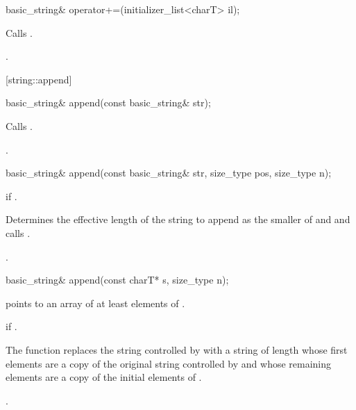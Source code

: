 %
%
\begin{itemdecl}
basic_string& operator+=(initializer_list<charT> il);
\end{itemdecl}

\begin{itemdescr}
\pnum
\effects Calls .

\pnum
\returns {}.
\end{itemdescr}


[string::append]{}

%
%
\begin{itemdecl}
basic_string&
  append(const basic_string& str);
\end{itemdecl}

\begin{itemdescr}
\pnum
\effects Calls .

\pnum
\returns
{}.
\end{itemdescr}

%
%
\begin{itemdecl}
basic_string&
  append(const basic_string& str, size_type pos, size_type n);
\end{itemdecl}

\begin{itemdescr}
\pnum
\requires
{}

\pnum
\throws
{}
if
.

\pnum
\effects
Determines the effective length 
of the string to append as the smaller of  and
 and calls .

\pnum
\returns
{}.
\end{itemdescr}

%
%
\begin{itemdecl}
basic_string&
  append(const charT* s, size_type n);
\end{itemdecl}

\begin{itemdescr}
\pnum
\requires {} points to an array of at least  elements
of .

\pnum
\throws {} if .

\pnum
\effects The function replaces the string controlled by 
with a string of length  whose first 
elements are a copy of the original string controlled by 
and whose remaining elements are a copy of the initial  elements
of .

\pnum
\returns
{}.
\end{itemdescr}

